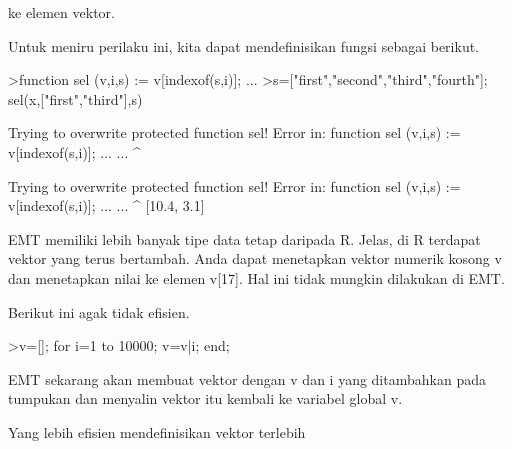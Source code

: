 \documentclass[a4paper,10pt]{article}
\begin{document}
\begin{eulernotebook}
\begin{eulercomment}
\begin{eulercomment}
\begin{eulercomment}
\begin{eulercomment}
\begin{eulercomment}
\begin{eulercomment}
\begin{eulercomment}
\begin{eulercomment}
\begin{eulercomment}
\begin{eulercomment}
\begin{eulercomment}
\begin{eulercomment}
\begin{eulercomment}
\begin{eulercomment}
\begin{eulercomment}
\begin{eulercomment}
\begin{eulercomment}
\begin{eulercomment}
\begin{eulercomment}
\begin{eulercomment}
\begin{eulercomment}
\begin{eulercomment}
\begin{eulercomment}
\begin{eulercomment}
\begin{eulercomment}
\begin{eulercomment}
\begin{eulercomment}
\begin{eulercomment}
\begin{eulercomment}
\begin{eulercomment}
\begin{eulercomment}
\begin{eulercomment}
\begin{eulercomment}
\begin{eulercomment}
\begin{eulercomment}
\begin{eulercomment}
\begin{eulercomment}
\begin{eulercomment}
\begin{eulercomment}
\begin{eulercomment}
\begin{eulercomment}
\begin{eulercomment}
\begin{eulercomment}
\begin{eulercomment}
\begin{eulercomment}
\begin{eulercomment}
\begin{eulercomment}
\begin{eulercomment}
\begin{eulercomment}
\begin{eulercomment}
\begin{eulercomment}
\begin{eulercomment}
\begin{eulercomment}
\begin{eulercomment}
\begin{eulercomment}
\begin{eulercomment}
\begin{eulercomment}
\begin{eulercomment}
\begin{eulercomment}
\begin{eulercomment}
\begin{eulercomment}
\begin{eulercomment}
\begin{eulercomment}
\begin{eulercomment}
\begin{eulercomment}
\begin{eulercomment}
\begin{eulercomment}
\begin{eulercomment}
\begin{eulercomment}
ke
elemen vektor.

Untuk meniru perilaku ini, kita dapat mendefinisikan fungsi sebagai
berikut.
\end{eulercomment}
\begin{eulerprompt}
>function sel (v,i,s) := v[indexof(s,i)]; ...
>s=["first","second","third","fourth"]; sel(x,["first","third"],s)
\end{eulerprompt}
\begin{euleroutput}
  
  Trying to overwrite protected function sel!
  Error in:
  function sel (v,i,s) := v[indexof(s,i)]; ... ...
               ^
  
  Trying to overwrite protected function sel!
  Error in:
  function sel (v,i,s) := v[indexof(s,i)]; ... ...
               ^
  [10.4,  3.1]
\end{euleroutput}
\begin{eulercomment}
EMT memiliki lebih banyak tipe data tetap daripada R. Jelas, di R
terdapat vektor yang terus bertambah. Anda dapat menetapkan vektor
numerik kosong v dan menetapkan nilai ke elemen v[17]. Hal ini tidak
mungkin dilakukan di EMT.

Berikut ini agak tidak efisien.
\end{eulercomment}
\begin{eulerprompt}
>v=[]; for i=1 to 10000; v=v|i; end;
\end{eulerprompt}
\begin{eulercomment}
EMT sekarang akan membuat vektor dengan v dan i yang ditambahkan pada
tumpukan dan menyalin vektor itu kembali ke variabel global v.

Yang lebih efisien mendefinisikan vektor terlebih 
\end{eulercomment}
\end{eulercomment}
\end{eulercomment}
\end{eulercomment}
\end{eulercomment}
\end{eulercomment}
\end{eulercomment}
\end{eulercomment}
\end{eulercomment}
\end{eulercomment}
\end{eulercomment}
\end{eulercomment}
\end{eulercomment}
\end{eulercomment}
\end{eulercomment}
\end{eulercomment}
\end{eulercomment}
\end{eulercomment}
\end{eulercomment}
\end{eulercomment}
\end{eulercomment}
\end{eulercomment}
\end{eulercomment}
\end{eulercomment}
\end{eulercomment}
\end{eulercomment}
\end{eulercomment}
\end{eulercomment}
\end{eulercomment}
\end{eulercomment}
\end{eulercomment}
\end{eulercomment}
\end{eulercomment}
\end{eulercomment}
\end{eulercomment}
\end{eulercomment}
\end{eulercomment}
\end{eulercomment}
\end{eulercomment}
\end{eulercomment}
\end{eulercomment}
\end{eulercomment}
\end{eulercomment}
\end{eulercomment}
\end{eulercomment}
\end{eulercomment}
\end{eulercomment}
\end{eulercomment}
\end{eulercomment}
\end{eulercomment}
\end{eulercomment}
\end{eulercomment}
\end{eulercomment}
\end{eulercomment}
\end{eulercomment}
\end{eulercomment}
\end{eulercomment}
\end{eulercomment}
\end{eulercomment}
\end{eulercomment}
\end{eulercomment}
\end{eulercomment}
\end{eulercomment}
\end{eulercomment}
\end{eulercomment}
\end{eulercomment}
\end{eulercomment}
\end{eulercomment}
\end{eulercomment}
\end{eulernotebook}
\end{document}
